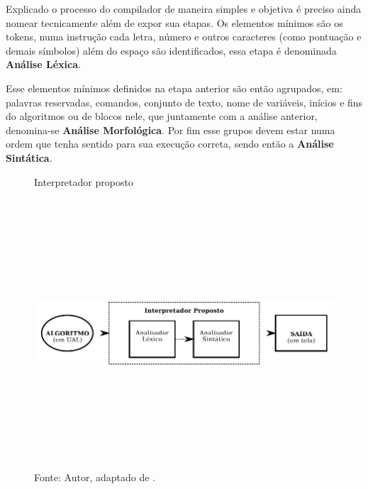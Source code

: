 %
%
%
%

Explicado o processo do compilador de maneira simples e objetiva é preciso ainda nomear tecnicamente além de expor sua etapas. Os elementos mínimos são os tokens, numa instrução cada letra, número e outros caracteres (como pontuação e demais símbolos)  além do espaço são identificados, essa etapa é denominada {\bfseries Análise Léxica}.

Esse elementos mínimos definidos na etapa anterior são então agrupados, em: palavras reservadas, comandos, conjunto de texto, nome de variáveis, inícios e fins do algoritmos ou de blocos nele, que juntamente com a análise anterior, denomina-se {\bfseries Análise Morfológica}. Por fim esse grupos devem estar numa ordem que tenha sentido para sua execução correta, sendo então a {\bfseries Análise Sintática}.

\begin{figure}[h]
  \ifdraft{\color{green}}{}\caption{\ifdraft{\color{green}}{}Interpretador proposto}\label{fig:analisador}
  \centering
\includegraphics[width=\textwidth,height=10cm,keepaspectratio]{figures/interpretador-proposto.pdf}
  \caption*{\ifdraft{\color{green}}{}\footnotesize Fonte: Autor, adaptado de .}
\end{figure}

